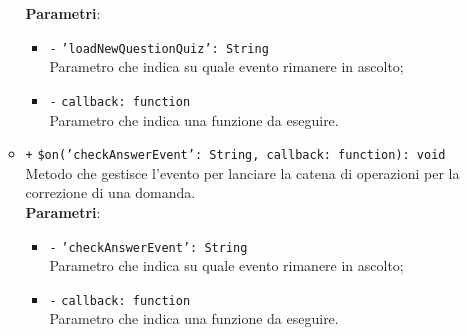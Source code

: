 \begin{itemize}
\begin{itemize}
	\textbf{Parametri}:
	\begin{itemize}
		\item \texttt{-} \texttt{'loadNewQuestionQuiz': String} \\
		Parametro che indica su quale evento rimanere in ascolto;
		\item \texttt{-} \texttt{callback: function} \\
		Parametro che indica una funzione da eseguire.
	\end{itemize}
	\item \texttt{+} \texttt{\$on('checkAnswerEvent': String, callback: function): void} \\
	Metodo che gestisce l'evento per lanciare la catena di operazioni per la correzione di una domanda. \\
	\textbf{Parametri}:
	\begin{itemize}
		\item \texttt{-} \texttt{'checkAnswerEvent': String} \\
		Parametro che indica su quale evento rimanere in ascolto;
		\item \texttt{-} \texttt{callback: function} \\
		Parametro che indica una funzione da eseguire.
	\end{itemize}
	\end{itemize}
\end{itemize}

	